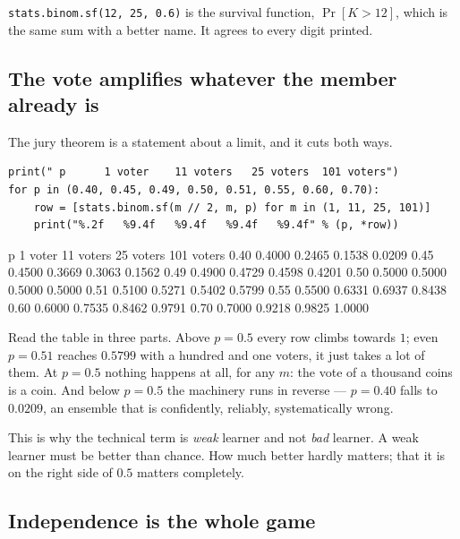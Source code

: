 \documentclass[11pt]{article}
\begin{document}
\texttt{stats.binom.sf(12, 25, 0.6)} is the survival function, $\Pr[K > 12]$,
which is the same sum with a better name. It agrees to every digit printed.

\subsection{The vote amplifies whatever the member already is}

The jury theorem is a statement about a limit, and it cuts both ways.

\begin{lstlisting}
print(" p      1 voter    11 voters   25 voters  101 voters")
for p in (0.40, 0.45, 0.49, 0.50, 0.51, 0.55, 0.60, 0.70):
    row = [stats.binom.sf(m // 2, m, p) for m in (1, 11, 25, 101)]
    print("%.2f   %9.4f   %9.4f   %9.4f   %9.4f" % (p, *row))
\end{lstlisting}
\begin{codeout}
 p      1 voter    11 voters   25 voters  101 voters
0.40      0.4000      0.2465      0.1538      0.0209
0.45      0.4500      0.3669      0.3063      0.1562
0.49      0.4900      0.4729      0.4598      0.4201
0.50      0.5000      0.5000      0.5000      0.5000
0.51      0.5100      0.5271      0.5402      0.5799
0.55      0.5500      0.6331      0.6937      0.8438
0.60      0.6000      0.7535      0.8462      0.9791
0.70      0.7000      0.9218      0.9825      1.0000
\end{codeout}

Read the table in three parts. Above $p = 0.5$ every row climbs towards $1$;
even $p = 0.51$ reaches $0.5799$ with a hundred and one voters, it just takes
a lot of them. At $p = 0.5$ nothing happens at all, for any $m$: the vote of a
thousand coins is a coin. And below $p = 0.5$ the machinery runs in reverse
--- $p = 0.40$ falls to $0.0209$, an ensemble that is confidently, reliably,
systematically wrong.

\begin{keyidea}
This is why the technical term is \emph{weak} learner and not \emph{bad}
learner. A weak learner must be better than chance. How much better hardly
matters; that it is on the right side of $0.5$ matters completely.
\end{keyidea}

\subsection{Independence is the whole game}
\label{sec:indep}
\end{document}
